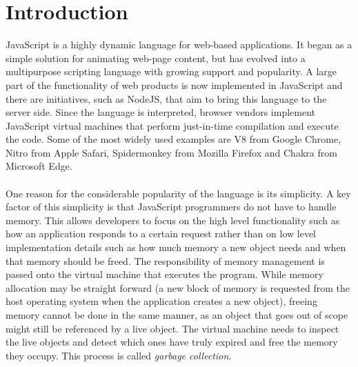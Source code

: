 \documentclass{l4proj}
\begin{document}
\section{Introduction}
\hspace*{3em} JavaScript is a highly dynamic language for web-based applications.\cite{intro} 
It began as a simple solution for animating web-page content, but has evolved into a multipurpose scripting language with growing support and popularity. A large part of the functionality of web products is now implemented in JavaScript and there are initiatives, such as NodeJS\cite{nodejs}, that aim to bring this language to the server side. Since the language is interpreted, browser vendors implement JavaScript virtual machines that perform just-in-time compilation and execute the code. Some of the most widely used examples are V8 from Google Chrome\cite{v8}, Nitro from Apple Safari, Spidermonkey\cite{spidermk} from Mozilla Firefox and Chakra\cite{chakra} from Microsoft Edge.
\\\\%
\hspace*{3em} One reason for the considerable popularity of the language is its simplicity. A key factor of this simplicity is that JavaScript programmers do not have to handle memory. This allows developers to focus on the high level functionality such as how an application responds to a certain request rather than on low level implementation details such as how much memory a new object needs and when that memory should be freed. The responsibility of memory management is passed onto the virtual machine that executes the program. While memory allocation may be straight forward (a new block of memory is requested from the host operating system when the application creates a new object), freeing memory cannot be done in the same manner, as an object that goes out of scope might still be referenced by a live object. The virtual machine needs to inspect the live objects and detect which ones have truly expired and free the memory they occupy. This process is called \textit{garbage collection}.
\\\\%
\end{document}
